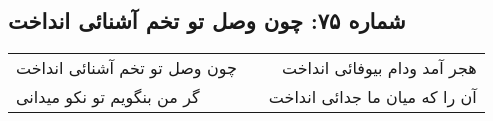 \begin{center}
\section*{شماره ۷۵: چون وصل تو تخم آشنائی انداخت}
\label{sec:075}
\begin{longtable}{l p{0.5cm} r}
چون وصل تو تخم آشنائی انداخت
&&
هجر آمد ودام بیوفائی انداخت
\\
گر من بنگویم تو نکو میدانی
&&
آن را که میان ما جدائی انداخت
\\
\end{longtable}
\end{center}
